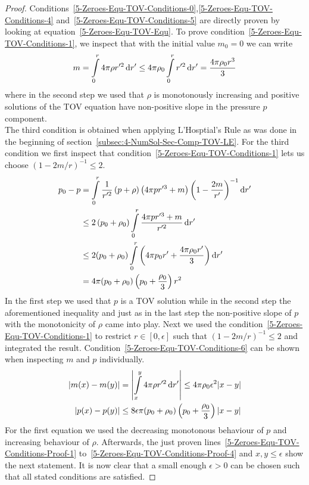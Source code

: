 \begin{proof}
	Conditions~\eqref{5-Zeroes-Equ-TOV-Conditions-0},\eqref{5-Zeroes-Equ-TOV-Conditions-4} and~\eqref{5-Zeroes-Equ-TOV-Conditions-5} are directly proven by looking at equation~\eqref{5-Zeroes-Equ-TOV-Equ}.
	To prove condition~\eqref{5-Zeroes-Equ-TOV-Conditions-1}, we inspect that with the initial value $m_0=0$ we can write
	\begin{equation}
		m = \int\limits_0^r 4\pi\rho r'^2 \mathop{}\!\mathrm{d} r'\leq4\pi\rho_0\int\limits_0^r r'^2 \mathop{}\!\mathrm{d} r'=\frac{4\pi\rho_0 r^3}{3}
		\label{eq:5-Zeroes-TOv-Conditions-Proof-Intermed-1}
	\end{equation}
	where in the second step we used that $\rho$ is monotonously increasing and positive solutions of the \ac{TOV} equation have non-positive slope in the pressure $p$ component.\\
	The third condition is obtained when applying L'Hosptial's Rule as was done in the beginning of section~\ref{subsec:4-NumSol-Sec-Comp-TOV-LE}.
	For the third condition we first inspect that condition~\ref{5-Zeroes-Equ-TOV-Conditions-1} lets us choose $(1-2m/r)^{-1}\leq 2$.
	\begin{align}
		p_0 - p &=\int\limits_0^r\frac{1}{r'^2}\left(p+\rho\right)\left(4\pi pr'^3+m\right)\left(1-\frac{2m}{r'}\right)^{-1}\mathop{}\!\mathrm{d} r'\label{5-Zeroes-Equ-TOV-Conditions-Proof-1}\\
				&\leq2\left(p_0+\rho_0\right)\int\limits_0^r\frac{4\pi pr'^3+m}{r'^2}\mathop{}\!\mathrm{d} r'\label{5-Zeroes-Equ-TOV-Conditions-Proof-2}\\
				&\leq2(p_0+\rho_0)\int\limits_0^r\left(4\pi p_0 r' + \frac{4\pi\rho_0 r'}{3}\right)\mathop{}\!\mathrm{d} r'\label{5-Zeroes-Equ-TOV-Conditions-Proof-3}\\
				&=4\pi(p_0+\rho_0)\left(p_0+\frac{\rho_0}{3}\right)r^2\label{5-Zeroes-Equ-TOV-Conditions-Proof-4}
	\end{align}
	In the first step we used that $p$ is a \ac{TOV} solution while in the second step the aforementioned inequality and just as in the last step the non-positive slope of $p$ with the monotonicity of $\rho$ came into play.
	Next we used the condition~\ref{5-Zeroes-Equ-TOV-Conditions-1} to restrict $r\in[0,\epsilon]$ such that $(1-2m/r)^{-1}\leq2$ and integrated the result.
	Condition~\eqref{5-Zeroes-Equ-TOV-Conditions-6} can be shown when inspecting $m$ and $p$ individually.
	\begin{align}
		|m(x)-m(y)|&=\left|\int\limits_x^y 4\pi\rho r'^2 \mathop{}\!\mathrm{d} r'\right|\leq4\pi\rho_0\epsilon^2|x-y|\\
		|p(x)-p(y)|&\leq8\epsilon\pi(p_0+\rho_0)\left(p_0+\frac{\rho_0}{3}\right)|x-y|
	\end{align}
	For the first equation we used the decreasing monotonous behaviour of $p$ and increasing behaviour of $\rho$.
	Afterwards, the just proven lines~\eqref{5-Zeroes-Equ-TOV-Conditions-Proof-1} to~\eqref{5-Zeroes-Equ-TOV-Conditions-Proof-4} and $x,y\leq\epsilon$ show the next statement.
	It is now clear that a small enough $\epsilon>0$ can be chosen such that all stated conditions are satisfied.
\end{proof}\noindent
